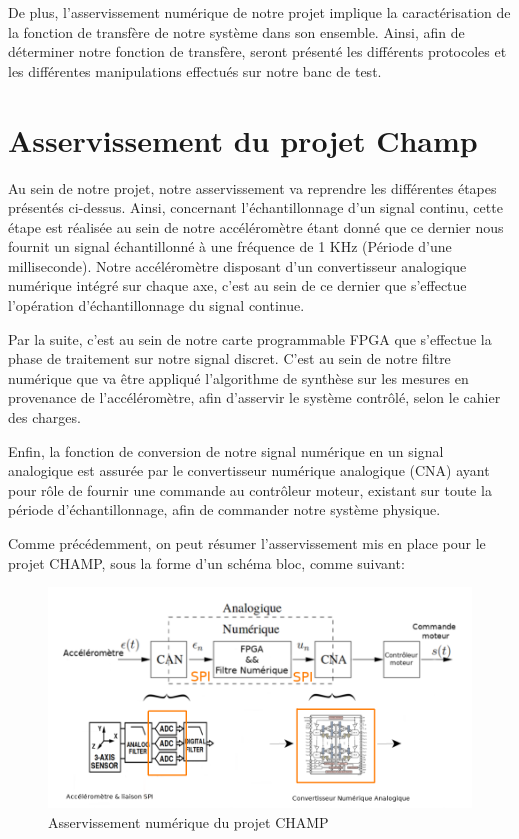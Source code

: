 \documentclass[french,a4paper,12pt]{report}
\begin{document}
	De plus, l'asservissement numérique de notre projet implique la caractérisation de la fonction de transfère de notre système dans son ensemble.
	Ainsi, afin de déterminer notre fonction de transfère, seront présenté les différents protocoles et les différentes manipulations effectués sur notre banc de test.

	\chapter{Asservissement du projet Champ}
	
		Au sein de notre projet, notre asservissement va reprendre les différentes étapes présentés ci-dessus. Ainsi, concernant l'échantillonnage d'un signal continu, cette étape est réalisée au sein de notre accéléromètre étant donné que ce dernier nous fournit un signal échantillonné à une fréquence de 1 KHz (Période d'une milliseconde). Notre accéléromètre disposant d'un convertisseur analogique numérique intégré sur chaque axe, c'est au sein de ce dernier que s'effectue l'opération d'échantillonnage du signal continue.
		
		Par la suite, c'est au sein de notre carte programmable FPGA que s'effectue la phase de traitement sur notre signal discret. C'est au sein de notre filtre numérique que va être appliqué l'algorithme de synthèse sur les mesures en provenance de l'accéléromètre, afin d'asservir le système contrôlé, selon le cahier des charges.
				
		Enfin, la fonction de conversion de notre signal numérique en un signal analogique est assurée par le convertisseur numérique analogique (CNA) ayant pour rôle de fournir une commande au contrôleur moteur, existant sur toute la période d'échantillonnage, afin de commander notre système physique.
		
		Comme précédemment, on peut résumer l'asservissement mis en place pour le projet CHAMP, sous la forme d'un schéma bloc, comme suivant:
		
	\begin{figure}[!ht]
    \center
  	\includegraphics[width=17cm]{Assert_2.png}
    \caption{Asservissement numérique du projet CHAMP}
	\end{figure}	
		
\end{document}
